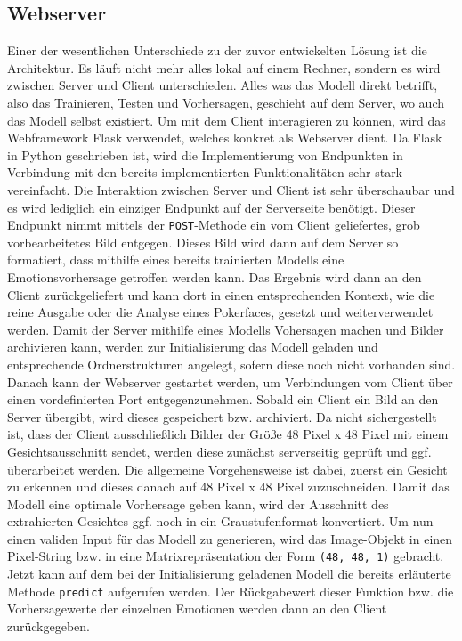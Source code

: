 \documentclass[12pt, a4paper]{report}
\begin{document}
\subsection{Webserver}
Einer der wesentlichen Unterschiede zu der zuvor entwickelten Lösung ist die Architektur. Es läuft nicht mehr alles lokal auf einem Rechner, sondern es wird zwischen Server und Client unterschieden. Alles was das Modell direkt betrifft, also das Trainieren, Testen und Vorhersagen, geschieht auf dem Server, wo auch das Modell selbst existiert. Um mit dem Client interagieren zu können, wird das Webframework Flask verwendet, welches konkret als Webserver dient. Da Flask in Python geschrieben ist, wird die Implementierung von Endpunkten in Verbindung mit den bereits implementierten Funktionalitäten sehr stark vereinfacht.\newline
Die Interaktion zwischen Server und Client ist sehr überschaubar und es wird lediglich ein einziger Endpunkt auf der Serverseite benötigt. Dieser Endpunkt nimmt mittels der \texttt{POST}-Methode ein vom Client geliefertes, grob vorbearbeitetes Bild entgegen. Dieses Bild wird dann auf dem Server so formatiert, dass mithilfe eines bereits trainierten Modells eine Emotionsvorhersage getroffen werden kann. Das Ergebnis wird dann an den Client zurückgeliefert und kann dort in einen entsprechenden Kontext, wie die reine Ausgabe oder die Analyse eines Pokerfaces, gesetzt und weiterverwendet werden.\newline
Damit der Server mithilfe eines Modells Vohersagen machen und Bilder archivieren kann, werden zur Initialisierung das Modell geladen und entsprechende Ordnerstrukturen angelegt, sofern diese noch nicht vorhanden sind. Danach kann der Webserver gestartet werden, um Verbindungen vom Client über einen vordefinierten Port entgegenzunehmen. Sobald ein Client ein Bild an den Server übergibt, wird dieses gespeichert bzw. archiviert. Da nicht sichergestellt ist, dass der Client ausschließlich Bilder der Größe 48 Pixel x 48 Pixel mit einem Gesichtsausschnitt  sendet, werden diese zunächst serverseitig geprüft und ggf. überarbeitet werden.  
Die allgemeine Vorgehensweise ist dabei, zuerst ein Gesicht zu erkennen und dieses danach auf 48 Pixel x 48 Pixel zuzuschneiden. Damit das Modell eine optimale Vorhersage geben kann, wird der Ausschnitt des extrahierten Gesichtes ggf. noch in ein Graustufenformat konvertiert. Um nun einen validen Input für das Modell zu generieren, wird das Image-Objekt in einen Pixel-String bzw. in eine Matrixrepräsentation der Form \texttt{(48, 48, 1)} gebracht. Jetzt kann auf dem bei der Initialisierung geladenen Modell die bereits erläuterte Methode \texttt{predict} aufgerufen werden. Der Rückgabewert dieser Funktion bzw. die Vorhersagewerte der einzelnen Emotionen werden dann an den Client zurückgegeben.
\end{document}
